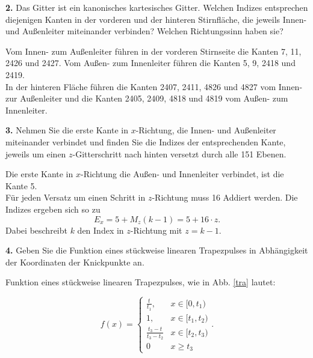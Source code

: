 \documentclass[Protokollheft.tex]{subfiles}
\begin{document}
\begin{framed}
	\noindent \textbf{2.} Das Gitter ist ein kanonisches kartesisches Gitter. Welchen
Indizes entsprechen diejenigen Kanten in der vorderen und der hinteren
Stirnfläche, die jeweils Innen- und Außenleiter miteinander
verbinden? Welchen Richtungssinn haben sie?\label{exer:idxConductorInterconnection}
\end{framed}
\noindent
Vom Innen- zum Außenleiter führen in der vorderen Stirnseite die Kanten 7, 11, 2426 und 2427. Vom Außen- zum Innenleiter führen die Kanten 5, 9, 2418 und 2419. \\
In der hinteren Fläche führen die Kanten 2407, 2411, 4826 und 4827 vom Innen- zur Außenleiter
und die Kanten 2405, 2409, 4818 und 4819 vom Außen- zum Innenleiter. 
\begin{framed}
	\noindent \textbf{3.} Nehmen Sie die erste Kante in $x$-Richtung, die Innen- und Außenleiter
miteinander verbindet und finden Sie die Indizes der
entsprechenden Kante, jeweils um einen $z$-Gitterschritt nach
hinten versetzt durch alle 151 Ebenen.\label{exer:idxEdge4allZ}
\end{framed}
\noindent
Die erste Kante in $x$-Richtung die Außen- und Innenleiter verbindet, ist die Kante 5. \\
Für jeden Versatz um einen Schritt in $z$-Richtung muss 16 Addiert werden. Die Indizes ergeben sich so zu 
\begin{equation}
	E_x = 5+M_z(k-1) = 5 + 16\cdot z.
\end{equation}
Dabei beschreibt $k$ den Index in $z$-Richtung mit $z=k-1$.
\begin{framed}
	\noindent \textbf{4.} Geben Sie die Funktion eines stückweise linearen
Trapezpulses in Abhängigkeit der Koordinaten der Knickpunkte an.\label{exer:calcPiecewiseTrapezoidal}
\end{framed}

Funktion eines stückweise linearen Trapezpulses, wie in Abb. \ref{tra}  lautet:

$$
f(x)=\left\{
\begin{array}{ll} \frac{t}{t_1}, & x\in [0,t_1) \\
1, & x\in [t_1,t_2) \\
\frac{t_3-t}{t_3-t_2} & x\in [t_2,t_3)\\
0 & x\geq t_3

\end{array}\right. .
$$
\end{document}
